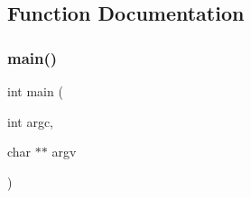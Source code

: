 \subsection{Function Documentation}
\mbox{\label{googletest-master_2googletest_2test_2gtest__repeat__test_8cc_a3c04138a5bfe5d72780bb7e82a18e627}} 
\subsubsection{\texorpdfstring{main()}{main()}}
{\footnotesize\ttfamily int main (\begin{DoxyParamCaption}\item[{int}]{argc,  }\item[{char $\ast$$\ast$}]{argv }\end{DoxyParamCaption})}

